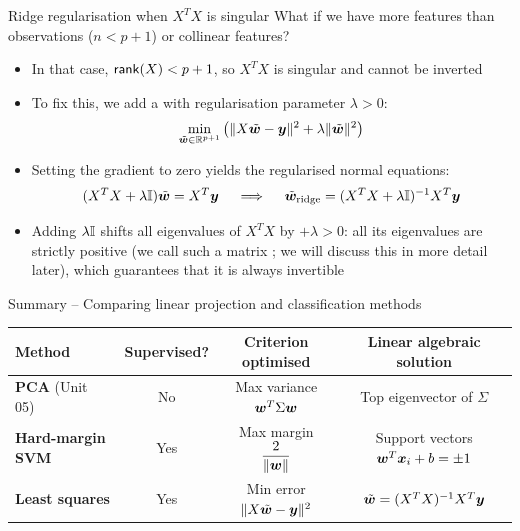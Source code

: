 \documentclass[aspectratio=169]{beamer}\usepackage[]{graphicx}\usepackage[]{xcolor}
\begin{document}


\begin{frame}{Ridge regularisation when $X^T X$ is singular}
    What if we have more features than observations ($n < p + 1$) or collinear features?
    \vfill
    \begin{itemize}
        \item In that case, $\mathsf{rank}(X) < p + 1$, so $X^T X$ is singular and cannot be inverted
        \vfill
        \item To fix this, we add a  with regularisation parameter $\lambda > 0$:
        \[
            \min_{\tilde{\bm{w}} \in \mathbb{R}^{p+1}} \left(\|X\tilde{\bm{w}} - \bm{y}\|^2 + \lambda \|\tilde{\bm{w}}\|^2\right)
        \]
        \vfill
        \item Setting the gradient to zero yields the regularised normal equations:
        \[
            (X^T X + \lambda \mathbb{I}) \tilde{\bm{w}} = X^T \bm{y} \quad \implies \quad \tilde{\bm{w}}_{\text{ridge}} = (X^T X + \lambda \mathbb{I})^{-1} X^T \bm{y}
        \]
        \vfill
        \item Adding $\lambda \mathbb{I}$ shifts all eigenvalues of $X^T X$ by $+\lambda > 0$: all its eigenvalues are strictly positive (we call such a matrix ; we will discuss this in more detail later), which guarantees that it is always invertible
    \end{itemize}
\end{frame}


\begin{frame}{Summary -- Comparing linear projection and classification methods}
    \centering
    \renewcommand{\arraystretch}{1.45}
    \scriptsize
    \begin{tabular}{@{}lccc@{}}
        \toprule
        \textbf{Method} & \textbf{Supervised?} & \textbf{Criterion optimised} & \textbf{Linear algebraic solution} \\
        \midrule
        \textbf{PCA} (Unit 05) & No & Max variance $\bm{w}^T \Sigma \bm{w}$ & Top eigenvector of $\Sigma$ \\
        \textbf{Hard-margin SVM} & Yes & Max margin $\dfrac{2}{\|\bm{w}\|}$ & Support vectors $\bm{w}^T \bm{x}_i + b = \pm 1$ \\
        \textbf{Least squares} & Yes & Min error $\|X\tilde{\bm{w}} - \bm{y}\|^2$ & $\tilde{\bm{w}} = (X^T X)^{-1} X^T \bm{y}$ \\
        \bottomrule
    \end{tabular}
\end{frame}





\end{document}
